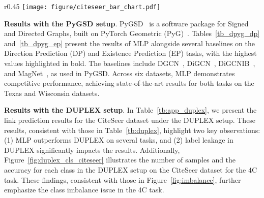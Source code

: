 \begin{wrapfigure}{r}{0.45\textwidth} %
    \centering
    \vspace{-3mm}
    \texttt{[image: figure/citeseer\_bar\_chart.pdf]}
    \vspace{-8mm}
    \caption{The number of samples and accuracy for each class of DUPLEX on the CiteSeer dataset in the 4C task.}
    \vspace{-2mm}
    \label{fig:duplex_cls_citeseer}
\end{wrapfigure}


\textbf{Results with the PyGSD setup}. PyGSD~\cite{dpyg} is a software package for Signed and Directed Graphs, built on PyTorch Geometric (PyG)~\cite{pyg}. Tables~\ref{tb_dpyg_dp} and~\ref{tb_dpyg_ep} present the results of MLP alongside several baselines on the Direction Prediction (DP) and Existence Prediction (EP) tasks, with the highest values highlighted in bold. The baselines include DGCN~\cite{dgcn-tong}, DiGCN~\cite{digcn}, DiGCNIB~\cite{digcn}, and MagNet~\cite{magnet}, as used in PyGSD. Across six datasets, MLP demonstrates competitive performance, achieving state-of-the-art results for both tasks on the Texas and Wisconsin datasets.


\textbf{Results with the DUPLEX setup}. In Table~\ref{tb:app_duplex}, we present the link prediction results for the CiteSeer dataset under the DUPLEX setup. These results, consistent with those in Table~\ref{tb:duplex}, highlight two key observations: (1) MLP outperforms DUPLEX on several tasks, and (2) label leakage in DUPLEX significantly impacts the results.
Additionally, Figure~\ref{fig:duplex_cls_citeseer} illustrates the number of samples and the accuracy for each class in the DUPLEX setup on the CiteSeer dataset for the 4C task. These findings, consistent with those in Figure~\ref{fig:imbalance}, further emphasize the class imbalance issue in the 4C task.





